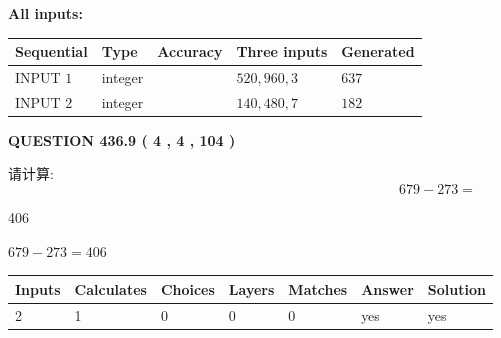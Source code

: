 \documentclass{ctexart}
\begin{document}
   
   
   
\noindent\vspace{0.1in}\hspace{-0.08in} {\textbf{\Large{All inputs: }}}
   
   
  
  
\noindent\begin{tabular}{|l|l|l|l|l|}
\hline
 Sequential & Type & Accuracy & Three inputs & Generated \\ 
\hline
 
 
  INPUT $  1 $ & integer &  & $
 520
 , 
 960
 , 
 3
 $ & $ 637 $ 
 \\  \hline  
 
 
  INPUT $  2 $ & integer &  & $
 140
 , 
 480
 , 
 7
 $ & $ 182 $ 
 \\  \hline  
 \end{tabular}
   
   
  
\vspace{0.2in}
  
{\textbf{\Large{QUESTION
436.9 
 ( 4 , 4 , 104 )
}}}
  
  
 
请计算:
\begin{equation}
679 -   %
273 = \nonumber
\end{equation}
 
 
 
\noindent{}
 
 

406
 
 
\noindent{}
 
 

 
 
 
\noindent{}
 
 

$ %
679 -  %
273=   %
406$
 
 
\noindent{}
 
 

 
   
   
   
   
\noindent\begin{tabular}{|l|l|l|l|l|l|l|}
 \hline
Inputs & Calculates & Choices & Layers & Matches & Answer & Solution \\ \hline
 2  & 
 1  & 
 0
  & 
 0  & 
 0  & 
  yes & 
  yes 
  \\ \hline
 \end{tabular}
   
\end{document}
